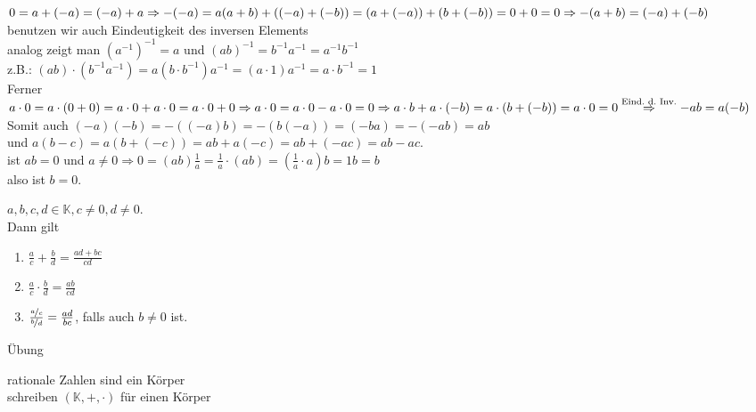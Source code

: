 \documentclass[../ana1.tex]{subfiles}
\begin{document}
\begin{bew}
	\(0 = a + (-a) = (-a) + a \\
	\Rightarrow -(-a) = a \\
	(a+b) + ((-a)+(-b)) = (a+(-a))+(b+(-b))=0+0=0 \\
	\Rightarrow -(a+b)=(-a)+(-b)\) \\
	benutzen wir auch Eindeutigkeit des inversen Elements\\
	analog zeigt man \({(a^{-1})}^{-1} = a\) und \({(ab)}^{-1} = b^{-1}a^{-1}=a^{-1}b^{-1}\) \\
	z.B.: \((ab)\cdot (b^{-1}a^{-1})=a(b\cdot b^{-1}) a^{-1} = (a\cdot 1)a^{-1} = a\cdot b^{-1}=1\) \\
	Ferner \(a\cdot 0 = a\cdot(0+0)=a\cdot 0 + a\cdot 0 = a\cdot 0 + 0 \\
		\Rightarrow a\cdot 0 = a\cdot 0 - a\cdot 0 = 0 \\
		\Rightarrow a\cdot b + a\cdot (-b) = a\cdot (b+(-b)) = a\cdot 0=0 \\
		\overset{\text{Eind.\ d.\ Inv.}}{\Rightarrow} -ab=a(-b)\) \\
	Somit auch \((-a)(-b) = -((-a)b) = -(b(-a)) = (-ba) = -(-ab) = ab\) \\
	und \(a(b-c) = a(b+(-c))=ab+a(-c)=ab+(-ac)=ab-ac\). \\
	ist \(ab = 0\) und \(a\neq 0 \Rightarrow 0=(ab)\frac{1}{a}=\frac{1}{a}\cdot (ab)=(\frac{1}{a}\cdot a)b = 1b = b\) \\
	also ist \(b=0\).
\end{bew}
\begin{satz}[Bruchrechnen]
	\(a,b,c,d\in\mathbb{K}, c\neq 0, d\neq 0\). \\
	Dann gilt
	\begin{enumerate}
		\item \(\frac{a}{c}+\frac{b}{d}=\frac{ad+bc}{cd}\)
		\item \(\frac{a}{c}\cdot\frac{b}{d}=\frac{ab}{cd}\)
		\item \(\frac{\nicefrac{a}{c}}{\nicefrac{b}{d}} = \frac{ad}{bc}\), falls auch \(b\neq 0\) ist.
	\end{enumerate}
\end{satz}
\begin{bew}
	Übung
\end{bew}
\begin{bsp}
	rationale Zahlen sind ein Körper\\
	schreiben \((\mathbb{K},+,\cdot)\) für einen Körper
\end{bsp}
\end{document}
